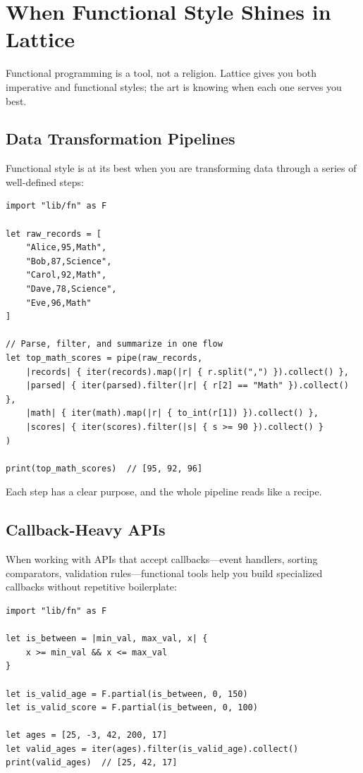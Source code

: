 \section{When Functional Style Shines in Lattice}\label{sec:when-functional}

Functional programming is a tool, not a religion.
Lattice gives you both imperative and functional styles; the art is knowing when each one serves you best.

\subsection{Data Transformation Pipelines}\label{subsec:when-pipelines}

Functional style is at its best when you are transforming data through a series of well-defined steps:

\begin{lstlisting}[language=Lattice, caption={A data transformation pipeline}]
import "lib/fn" as F

let raw_records = [
    "Alice,95,Math",
    "Bob,87,Science",
    "Carol,92,Math",
    "Dave,78,Science",
    "Eve,96,Math"
]

// Parse, filter, and summarize in one flow
let top_math_scores = pipe(raw_records,
    |records| { iter(records).map(|r| { r.split(",") }).collect() },
    |parsed| { iter(parsed).filter(|r| { r[2] == "Math" }).collect() },
    |math| { iter(math).map(|r| { to_int(r[1]) }).collect() },
    |scores| { iter(scores).filter(|s| { s >= 90 }).collect() }
)

print(top_math_scores)  // [95, 92, 96]
\end{lstlisting}

Each step has a clear purpose, and the whole pipeline reads like a recipe.

\subsection{Callback-Heavy APIs}\label{subsec:when-callbacks}

When working with APIs that accept callbacks---event handlers, sorting comparators, validation rules---functional tools help you build specialized callbacks without repetitive boilerplate:

\begin{lstlisting}[language=Lattice, caption={Building validators with partial application}]
import "lib/fn" as F

let is_between = |min_val, max_val, x| {
    x >= min_val && x <= max_val
}

let is_valid_age = F.partial(is_between, 0, 150)
let is_valid_score = F.partial(is_between, 0, 100)

let ages = [25, -3, 42, 200, 17]
let valid_ages = iter(ages).filter(is_valid_age).collect()
print(valid_ages)  // [25, 42, 17]
\end{lstlisting}

